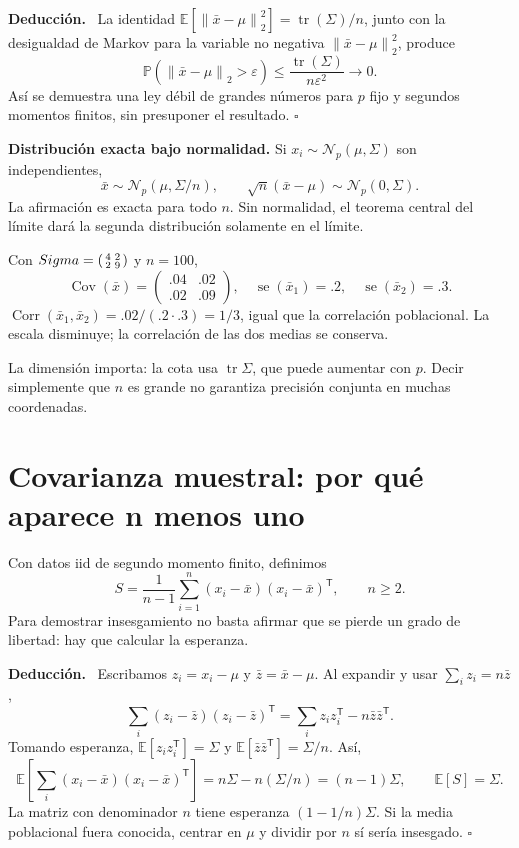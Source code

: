 \documentclass[11pt,a4paper]{article}
\newcommand{\E}{\mathbb E}
\newcommand{\Prob}{\mathbb P}
\newcommand{\T}{^{\mathsf T}}
\newcommand{\norm}[1]{\left\lVert #1\right\rVert}
\DeclareMathOperator{\Cov}{Cov}
\DeclareMathOperator{\Corr}{Corr}
\DeclareMathOperator{\tr}{tr}
\newcommand{\Normal}{\mathcal N}
\newcommand{\topic}[2]{\clearpage\section{#1}\label{#2}}
\newenvironment{deduccion}{\par\textbf{Deducción.}\ }{\hfill$\square$\par}
\theoremstyle{definition}\newtheorem{definicion}[teorema]{Definición}
\begin{document}
\begin{deduccion}
La identidad $\E[\norm{\bar x-\mu}_2^2]=\tr(\Sigma)/n$,
junto con la desigualdad de Markov para la variable no negativa
$\norm{\bar x-\mu}_2^2$, produce
\[
\Prob(\norm{\bar x-\mu}_2>\varepsilon)
\le \frac{\tr(\Sigma)}{n\varepsilon^2}\longrightarrow0.
\]
Así se demuestra una ley débil de grandes números para $p$ fijo y segundos
momentos finitos, sin presuponer el resultado.
\end{deduccion}

\textbf{Distribución exacta bajo normalidad.}
Si $x_i\sim\Normal_p(\mu,\Sigma)$ son independientes,
\[
\bar x\sim\Normal_p(\mu,\Sigma/n),\qquad
\sqrt n(\bar x-\mu)\sim\Normal_p(0,\Sigma).
\]
La afirmación es exacta para todo $n$. Sin normalidad, el teorema central
del límite dará la segunda distribución solamente en el límite.

\begin{ejemplo}
Con $\Sigma=\begin{psmallmatrix}4&2\\2&9\end{psmallmatrix}$ y $n=100$,
\[
\Cov(\bar x)=\begin{pmatrix}.04&.02\\.02&.09\end{pmatrix},
\quad \operatorname{se}(\bar x_1)=.2,\quad
\operatorname{se}(\bar x_2)=.3.
\]
$\Corr(\bar x_1,\bar x_2)=.02/(.2\cdot.3)=1/3$,
igual que la correlación poblacional. La escala disminuye; la correlación
de las dos medias se conserva.
\end{ejemplo}
La dimensión importa: la cota usa $\tr\Sigma$, que puede aumentar con $p$.
Decir simplemente que $n$ es grande no garantiza precisión conjunta en
muchas coordenadas.

\topic{Covarianza muestral: por qué aparece n menos uno}{s24}
Con datos iid de segundo momento finito, definimos
\[
S=\frac1{n-1}\sum_{i=1}^n(x_i-\bar x)(x_i-\bar x)\T,\qquad n\ge2.
\]
Para demostrar insesgamiento no basta afirmar que se pierde un grado de
libertad: hay que calcular la esperanza.

\begin{deduccion}
Escribamos $z_i=x_i-\mu$ y $\bar z=\bar x-\mu$. Al expandir y usar
$\sum_i z_i=n\bar z$,
\[
\sum_i(z_i-\bar z)(z_i-\bar z)\T
=\sum_i z_iz_i\T-n\bar z\bar z\T.
\]
Tomando esperanza,
$\E[z_iz_i\T]=\Sigma$ y
$\E[\bar z\bar z\T]=\Sigma/n$. Así,
\[
\E\!\left[\sum_i(x_i-\bar x)(x_i-\bar x)\T\right]
=n\Sigma-n(\Sigma/n)=(n-1)\Sigma,\qquad
\boxed{\E[S]=\Sigma}.
\]
La matriz con denominador $n$ tiene esperanza $(1-1/n)\Sigma$.
Si la media poblacional fuera conocida, centrar en $\mu$ y dividir por
$n$ sí sería insesgado.
\end{deduccion}
\end{document}
